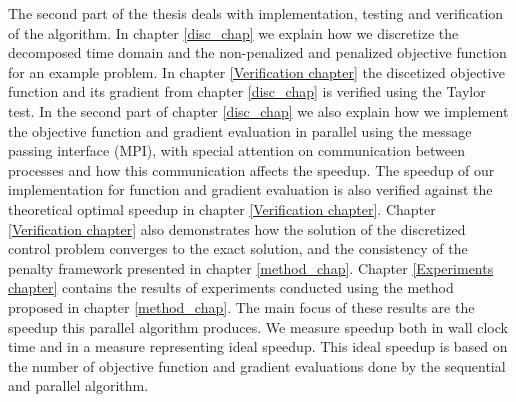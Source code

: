 The second part of the thesis deals with implementation, testing and verification of the algorithm. In chapter \ref{disc_chap} we explain how we discretize the decomposed time domain and the non-penalized and penalized objective function for an example problem. In chapter \ref{Verification chapter} the discetized objective function and its gradient from chapter \ref{disc_chap} is verified using the Taylor test. In the second part of chapter \ref{disc_chap} we also explain how we implement the objective function and gradient evaluation in parallel using the message passing interface (MPI), with special attention on communication between processes and how this communication affects the speedup. The speedup of our implementation for function and gradient evaluation is also verified against the theoretical optimal speedup in chapter \ref{Verification chapter}. Chapter \ref{Verification chapter} also demonstrates how the solution of the discretized control problem converges to the exact solution, and the consistency of the penalty framework presented in chapter \ref{method_chap}. Chapter \ref{Experiments chapter} contains the results of experiments conducted using the method proposed in chapter \ref{method_chap}. The main focus of these results are the speedup this parallel algorithm produces. We measure speedup both in wall clock time and in a measure representing ideal speedup. This ideal speedup is based on the number of objective function and gradient evaluations done by the sequential and parallel algorithm.
